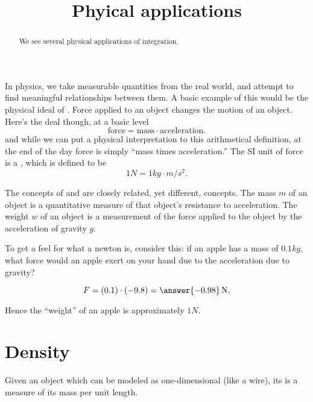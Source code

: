 \documentclass{ximera}
\title[Dig-In:]{Phyical applications}
\begin{document}
\begin{abstract}
We see several physical applications of integration.
\end{abstract}
\maketitle


In physics, we take measurable quantities from the real world, and
attempt to find meaningful relationships between them. A basic example
of this would be the physical ideal of . Force applied to an
object changes the motion of an object. Here's the deal though, at a
basic level
\[
\mathrm{force} = \mathrm{mass} \cdot \mathrm{acceleration}.
\]
and while we can put a physical interpretation to this arithmetical
definition, at the end of the day force is simply ``mass times
acceleration.'' The SI unit of force is a , which is defined to be
\[
1\unit{N} = 1\unit{kg}\cdot \unit{m}/\unit{s}^2. 
\]

\begin{warning}
  The concepts of  and  are closely related, yet
  different, concepts. The mass $m$ of an object is a quantitative
  measure of that object's resistance to acceleration. The weight $w$
  of an object is a measurement of the force applied to the object by
  the acceleration of gravity $g$.
\end{warning}

\begin{question}
  To get a feel for what a newton is, consider this: if an apple has a
  mass of $0.1\unit{kg}$, what force would an apple exert on your hand
  due to the acceleration due to gravity?
  \begin{prompt}
  \[
  F = (0.1) \cdot (-9.8) = \answer{-0.98}\unit{N},
  \]
  \end{prompt}
\begin{feedback}
  Hence the ``weight'' of an apple is approximately $1\unit{N}$.
\end{feedback}
\end{question}






\section{Density}

Given an object which can be modeled as one-dimensional (like a wire),
its  is a measure of its mass per unit length.
\end{document}
